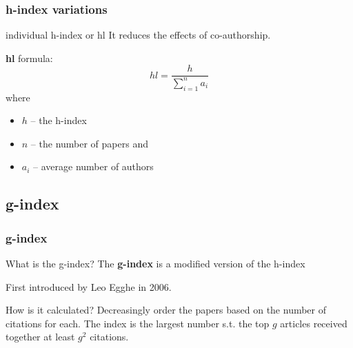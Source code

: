\documentclass{beamer}
\begin{document}
\begin{frame}
    \frametitle{h-index variations}
    \begin{block}{individual h-index or hl}
        It reduces the effects of co-authorship.
    \end{block}

    \textbf{hl} formula:
    \[
        hl = \frac{h}{\sum\limits_{i=1}^n a_i}
    \]
    where
    \begin{itemize}
        \item $h$ -- the h-index
        \item $n$ -- the number of papers and
        \item $a_i$ -- average number of authors
    \end{itemize}
\end{frame}

\subsection{g-index}
\begin{frame}
    \frametitle{g-index}
    \begin{block}{What is the g-index?}
        The \textbf{g-index}\cite{egghe2006theory} is a modified version of the h-index
    \end{block}

    \begin{alertblock}{}
        First introduced by Leo Egghe in 2006.
    \end{alertblock}

    \begin{block}{How is it calculated?}
        Decreasingly order the papers based on the number of citations for each.
        The index is the largest number s.t. the top $g$ articles received together
        at least $g^2$ citations.
    \end{block}
\end{frame}
\end{document}
